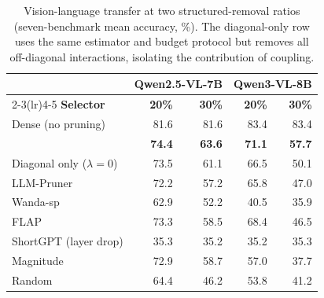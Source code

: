 \begin{table}[tbp]
\centering\singlespacing\footnotesize
\caption{Vision-language transfer at two structured-removal ratios (seven-benchmark mean accuracy, \%). The diagonal-only row uses the same estimator and budget protocol but removes all off-diagonal interactions, isolating the contribution of coupling.}
\label{tab:cc-vlm-sweep}
\setlength{\tabcolsep}{5pt}\renewcommand{\arraystretch}{1.05}
\begin{tabular}{lrrrr}
\toprule
& \multicolumn{2}{c}{\textbf{Qwen2.5-VL-7B}} & \multicolumn{2}{c}{\textbf{Qwen3-VL-8B}}\\
\cmidrule(lr){2-3}\cmidrule(lr){4-5}
\textbf{Selector} & \textbf{20\%} & \textbf{30\%} & \textbf{20\%} & \textbf{30\%}\\
\midrule
Dense (no pruning) & 81.6 & 81.6 & 83.4 & 83.4\\
\rowcolor{SoftBlue}\textbf{\CoCurve{}} & \textbf{74.4} & \textbf{63.6} & \textbf{71.1} & \textbf{57.7}\\
Diagonal only ($\lambda=0$) & 73.5 & 61.1 & 66.5 & 50.1\\
\midrule
LLM-Pruner & 72.2 & 57.2 & 65.8 & 47.0\\
Wanda-sp & 62.9 & 52.2 & 40.5 & 35.9\\
FLAP & 73.3 & 58.5 & 68.4 & 46.5\\
ShortGPT (layer drop) & 35.3 & 35.2 & 35.2 & 35.3\\
Magnitude & 72.9 & 58.7 & 57.0 & 37.7\\
Random & 64.4 & 46.2 & 53.8 & 41.2\\
\bottomrule
\end{tabular}
\end{table}
